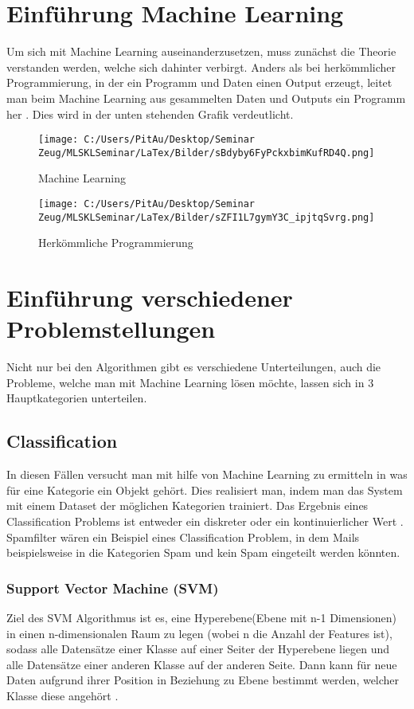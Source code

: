 \chapter{Einführung Machine Learning}
\label{chap:einführungMachineLearning}
Um sich mit Machine Learning auseinanderzusetzen, muss zunächst die Theorie verstanden werden, welche sich dahinter verbirgt. Anders als bei herkömmlicher Programmierung, in der ein Programm und Daten einen Output erzeugt, leitet man beim Machine Learning aus gesammelten Daten und Outputs ein Programm her \cite[S.~3]{WML}.  Dies wird in der unten stehenden Grafik verdeutlicht.
\newline

\begin{figure}
	\texttt{[image: C:/Users/PitAu/Desktop/Seminar Zeug/MLSKLSeminar/LaTex/Bilder/sBdyby6FyPckxbimKufRD4Q.png]}
	\caption{Machine Learning}\cite[S.~3]{WML}
\end{figure}
\begin{figure}
	\texttt{[image: C:/Users/PitAu/Desktop/Seminar Zeug/MLSKLSeminar/LaTex/Bilder/sZFI1L7gymY3C\_ipjtqSvrg.png]}
	\caption{Herkömmliche Programmierung}\cite[S.~3]{WML}
\end{figure}


\chapter{Einführung verschiedener Problemstellungen}
\label{chap:einführungProblemstellungen}
Nicht nur bei den Algorithmen gibt es verschiedene Unterteilungen, auch die Probleme, welche man mit Machine Learning lösen möchte, lassen sich in 3 Hauptkategorien unterteilen.

\section{Classification}
\label{sec:classification}
In diesen Fällen versucht man mit hilfe von Machine Learning zu ermitteln in was für eine Kategorie ein Objekt gehört\cite{SKL}. Dies realisiert man, indem man das System mit einem Dataset der möglichen Kategorien trainiert. Das Ergebnis eines Classification Problems ist entweder ein diskreter oder ein kontinuierlicher Wert \cite[S.~4]{WML}. Spamfilter wären ein Beispiel eines Classification Problem, in dem Mails beispielsweise in die Kategorien Spam und kein Spam eingeteilt werden könnten. 

\subsection{Support Vector Machine (SVM)}
\label{sec:SVM}
Ziel des SVM Algorithmus ist es, eine Hyperebene(Ebene mit n-1 Dimensionen) in einen n-dimensionalen Raum zu legen (wobei n die Anzahl der Features ist), sodass alle Datensätze einer Klasse auf einer Seiter der Hyperebene liegen und alle Datensätze einer anderen Klasse auf der anderen Seite. Dann kann für neue Daten aufgrund ihrer Position in Beziehung zu Ebene bestimmt werden, welcher Klasse diese angehört \cite[S.~177f.]{WML}.

